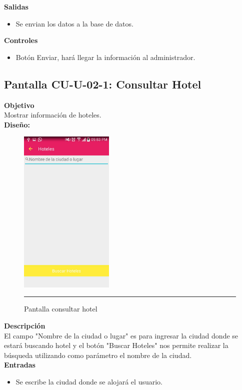 \textbf{Salidas}
\begin{itemize}
\item Se envian los datos a la base de datos.
\end{itemize}

\textbf{Controles}
\begin{itemize}
\item Botón Enviar, hará llegar la información al administrador.
\end{itemize}
\clearpage
\hypertarget{CU-U-02-1}{}
\subsection{Pantalla CU-U-02-1: Consultar Hotel}
\textbf{Objetivo}\\
Mostrar información de hoteles. \\

\textbf{Diseño:}
\begin{figure}[h]
	\centering
		\includegraphics[width=0.4\textwidth]{Figuras/intHoteles.jpg}
		\rule{30em}{0.5pt}
	\caption[Pantalla consultar hotel]{Pantalla consultar hotel}
	\label{fig:intHoteles}
\end{figure}

\textbf{Descripción} \\
El campo "Nombre de la ciudad o lugar" es para ingresar la ciudad donde se estará buscando hotel y el botón "Buscar Hoteles" nos permite realizar la búsqueda utilizando como parámetro el nombre de la ciudad. \\

\textbf{Entradas}
\begin{itemize}
\item Se escribe la ciudad donde se alojará el usuario.
\end{itemize}

